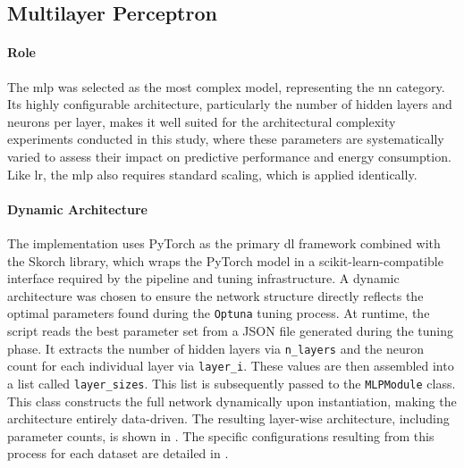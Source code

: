 \subsection{Multilayer Perceptron}
\label{implementation_mlp}

\paragraph{Role}
The \gls{mlp} was selected as the most complex model, representing the \gls{nn} category. Its highly configurable architecture, particularly the number of hidden layers and neurons per layer, makes it well suited for the architectural complexity experiments conducted in this study, where these parameters are systematically varied to assess their impact on predictive performance and energy consumption. Like \gls{lr}, the \gls{mlp} also requires standard scaling, which is applied identically.

\paragraph{Dynamic Architecture}
The implementation uses PyTorch as the primary \gls{dl} framework combined with the Skorch library, which wraps the PyTorch model in a scikit-learn-compatible interface required by the pipeline and tuning infrastructure. A dynamic architecture was chosen to ensure the network structure directly reflects the optimal parameters found during the \texttt{Optuna} tuning process. At runtime, the script reads the best parameter set from a JSON file generated during the tuning phase. It extracts the number of hidden layers via \texttt{n\_layers} and the neuron count for each individual layer via \texttt{layer\_i}. These values are then assembled into a list called \texttt{layer\_sizes}. This list is subsequently passed to the \texttt{MLPModule} class. This class constructs the full network dynamically upon instantiation, making the architecture entirely data-driven. The resulting layer-wise architecture, including parameter counts, is shown in . The specific configurations resulting from this process for each dataset are detailed in .


